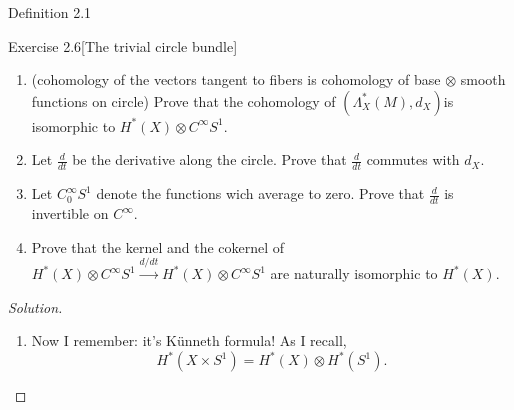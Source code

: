 \begin{thing3}{Definition 2.1}
\begin{thing4}{Exercise 2.6}[The trivial circle bundle]
\begin{enumerate}[label=(\alph*)]
\item {\color{6}(cohomology of the vectors tangent to fibers is cohomology of base \(\otimes\) smooth functions on circle)} Prove that the cohomology of \((\Lambda^{*}_X(M),d_X)\)is isomorphic to \(H^{*}(X)\otimes C^\infty S^1\).
\item Let \(\frac{d}{dt}\) be the derivative along the circle. Prove that \(\frac{d}{dt}\) commutes with \(d_X\).
\item Let \(C^\infty_0S^1\) denote the functions wich average to zero. Prove that \(\frac{d}{dt}\) is invertible on \(C^\infty\).
\item Prove that the kernel and the cokernel of \(H^{*}(X)\otimes C^\infty S^1\xrightarrow{d/dt}H^{*}(X)\otimes C^\infty S^1\) are naturally isomorphic to \(H^{*}(X)\).
\end{enumerate}
\end{thing4}

\begin{proof}[Solution]\leavevmode
\begin{enumerate}
\item 
	\iffalse Right so a form \(\alpha\) of the circle bundle is a linear operator on \(TM\). So what is \(TM\). It is a point and a vector, so \((p,e^{it}) \in X \times S^1\) and \((v,r)\in TX \oplus TS^1\). And \(\alpha\) will map \((v,r)\), or some tuple of vectors, to a number.

	I would like to have an expression for \(\alpha\) decomposed as a form on \(X\) and a form on \(S^1\). Well, just as \(T(M)=T(X) \oplus  T(S^1)\) we should have \(T^*(M)=T^*(X)\oplus T^*(S^1)\). And immediately we get that \(\alpha = \omega \oplus \eta\).

	So the cohomology class of \(\alpha\), if it is closed, …
\fi
	Now I  remember: it's Künneth formula! As I recall,
	\[H^*(X \times S^1)=H^{*}(X) \otimes H^*(S^1).\]


\end{enumerate}
\end{proof}
\end{thing3}
